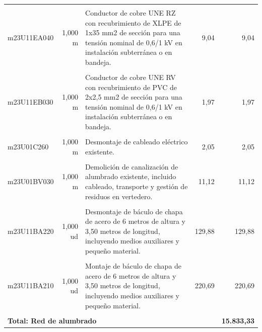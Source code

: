 \documentclass{book}%
\begin{document}
\begin{longtable}{lrlrr}
&&&&\\%
m23U11EA040&     1,000 m&\multicolumn{1}{p{5cm}}{Conductor de cobre UNE RZ con recubrimiento de XLPE de 1x35 mm2 de sección para una tensión nominal de 0,6/1 kV en instalación subterránea o en bandeja.}&      9,04&9,04\\%
&&&&\\%
m23U11EB030&     1,000 m&\multicolumn{1}{p{5cm}}{Conductor de cobre UNE RV con recubrimiento de PVC de 2x2,5 mm2 de sección para una tensión nominal de 0,6/1 kV en instalación subterránea o en bandeja.}&      1,97&1,97\\%
&&&&\\%
m23U01C260&     1,000 m&\multicolumn{1}{p{5cm}}{Desmontaje de cableado eléctrico existente.}&      2,05&2,05\\%
&&&&\\%
m23U01BV030&     1,000 m&\multicolumn{1}{p{5cm}}{Demolición de canalización de alumbrado existente, incluido cableado, transporte y gestión de residuos en vertedero.}&     11,12&11,12\\%
&&&&\\%
m23U11BA220&     1,000 ud&\multicolumn{1}{p{5cm}}{Desmontaje de báculo de chapa de acero de 6 metros de altura y 3,50 metros de longitud, incluyendo medios auxiliares y pequeño material.}&    129,88&129,88\\%
&&&&\\%
m23U11BA210&     1,000 ud&\multicolumn{1}{p{5cm}}{Montaje de báculo de chapa de acero de 6 metros de altura y 3,50 metros de longitud, incluyendo medios auxiliares y pequeño material.}&    220,69&220,69\\%
&&&&\\%
\multicolumn{4}{p{8cm}}{\textbf{Total: Red de alumbrado}}&\textbf{15.833,33}\\%
\end{longtable}%
\normalsize

%
\end{document}
